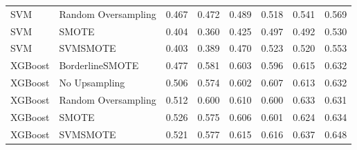 \begin{tabular}{llllllll}
                         SVM & Random Oversampling & 0.467 &                     0.472 &                 0.489 &                  0.518 &                                   0.541 &     0.569 \\
                         SVM &               SMOTE & 0.404 &                     0.360 &                 0.425 &                  0.497 &                                   0.492 &     0.530 \\
                         SVM &            SVMSMOTE & 0.403 &                     0.389 &                 0.470 &                  0.523 &                                   0.520 &     0.553 \\
                     XGBoost &     BorderlineSMOTE & 0.477 &                     0.581 &                 0.603 &                  0.596 &                                   0.615 &     0.632 \\
                     XGBoost &       No Upsampling & 0.506 &                     0.574 &                 0.602 &                  0.607 &                                   0.613 &     0.632 \\
                     XGBoost & Random Oversampling & 0.512 &                     0.600 &                 0.610 &                  0.600 &                                   0.633 &     0.631 \\
                     XGBoost &               SMOTE & 0.526 &                     0.575 &                 0.606 &                  0.601 &                                   0.624 &     0.634 \\
                     XGBoost &            SVMSMOTE & 0.521 &                     0.577 &                 0.615 &                  0.616 &                                   0.637 &     0.648 \\
\bottomrule
\end{tabular}
